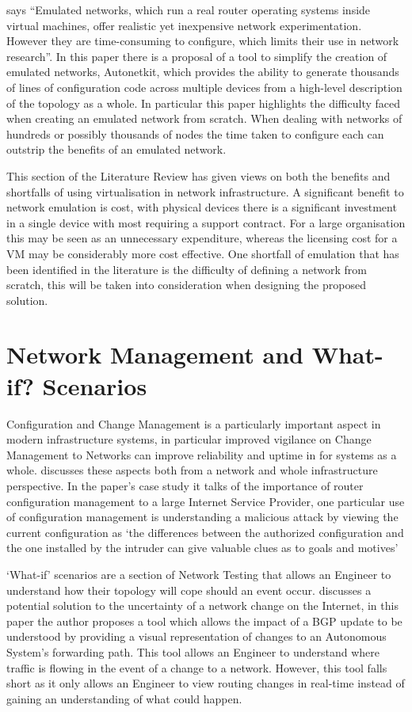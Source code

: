 \documentclass[11pt]{report}
\begin{document}
\citep{Knight:2012:ASL:2342356.2342378} says ``Emulated networks, which run a real router operating systems inside virtual machines, offer realistic yet inexpensive network experimentation. However they are time-consuming to configure, which limits their use in network research''. In this paper there is a proposal of a tool to simplify the creation of emulated networks, Autonetkit, which provides the ability to generate thousands of lines of configuration code across multiple devices from a high-level description of the topology as a whole. In particular this paper highlights the difficulty faced when creating an emulated network from scratch. When dealing with networks of hundreds or possibly thousands of nodes the time taken to configure each can outstrip the benefits of an emulated network.

This section of the Literature Review has given views on both the benefits and shortfalls of using virtualisation in network infrastructure. A significant benefit to network emulation is cost, with physical devices there is a significant investment in a single device with most requiring a support contract. For a large organisation this may be seen as an unnecessary expenditure, whereas the licensing cost for a VM may be considerably more cost effective. One shortfall of emulation that has been identified in the literature is the difficulty of defining a network from scratch, this will be taken into consideration when designing the proposed solution.

\section{Network Management and What-if? Scenarios}

Configuration and Change Management is a particularly important aspect in modern infrastructure systems, in particular improved vigilance on Change Management to Networks can improve reliability and uptime in for systems as a whole. \citep[p.270-273]{bellovin2009configuration} discusses these aspects both from a network and whole infrastructure perspective. In the paper's case study it talks of the importance of router configuration management to a large Internet Service Provider, one particular use of configuration management is understanding a malicious attack by viewing the current configuration as `the differences between the authorized configuration and the one installed by the intruder can give valuable clues as to goals and motives'

`What-if' scenarios are a section of Network Testing that allows an Engineer to understand how their topology will cope should an event occur. \citep{lad2006visualizing} discusses a potential solution to the uncertainty of a network change on the Internet, in this paper the author proposes a tool which allows the impact of a BGP update to be understood by providing a visual representation of changes to an Autonomous System's forwarding path. This tool allows an Engineer to understand where traffic is flowing in the event of a change to a network. However, this tool falls short as it only allows an Engineer to view routing changes in real-time instead of gaining an understanding of what could happen.
\end{document}
